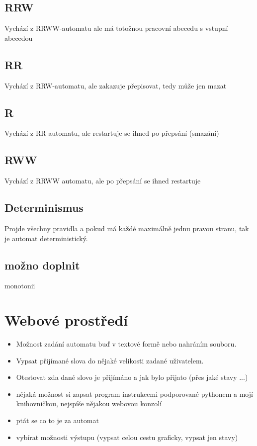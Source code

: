 \documentclass{article}
\begin{document}
\subsection{RRW}
Vychází z RRWW-automatu ale má totožnou pracovní abecedu s vstupní abecedou
\subsection{RR}
Vychází z RRW-automatu, ale zakazuje přepisovat, tedy může jen mazat
\subsection{R}
Vychází z RR automatu, ale restartuje se ihned po přepsání (smazání)
\subsection{RWW}
Vychází z RRWW automatu, ale po přepsání se ihned restartuje

\subsection{Determinismus}
Projde všechny pravidla a pokud má každé maximálně jednu pravou stranu, tak je automat deterministický.

\subsection{možno doplnit}
monotonii

\section{Webové prostředí}
\begin{itemize}
	\item Možnost zadání automatu buď v textové formě nebo nahráním souboru.
	\item Vypsat přijímané slova do nějaké velikosti zadané uživatelem.
	\item Otestovat zda dané slovo je přijímáno a jak bylo přijato (přes jaké stavy ...)
	\item nějaká možnost si zapsat program instrukcemi podporované pythonem a mojí knihovničkou, nejspíše nějakou webovou konzolí
	\item ptát se co to je za automat
	\item vybírat možnosti výstupu (vypsat celou cestu graficky, vypsat jen stavy)
\end{itemize}
\end{document}
